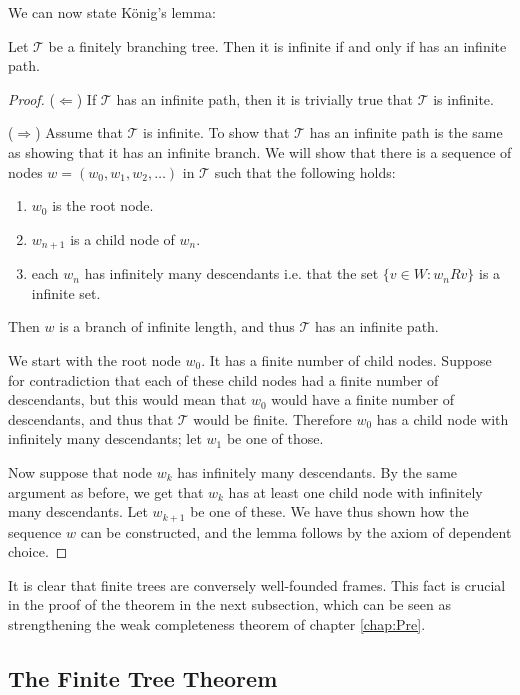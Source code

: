\documentclass[../main.tex]{subfiles}
\begin{document}
We can now state König's lemma:
\begin{lemma}
	\label{lem:kong}
	Let $\mathcal{T}$ be a finitely branching tree. Then it is infinite if
	and only if has an infinite path.
\end{lemma}
\begin{proof}
	($\Leftarrow$)
	If $\mathcal{T}$ has an infinite path, then it is trivially true that
	$\mathcal{T}$ is infinite. 

	($\Rightarrow$) Assume that $\mathcal{T}$ is infinite. To show that
	$\mathcal{T}$ has an infinite path is the same as showing that it has
	an infinite branch. We will show that there is a sequence of nodes
	$w=(w_0,w_1,w_2,\ldots)$ in $\mathcal{T}$ such that the following holds:
	\begin{enumerate}
		\item $w_0$ is the root node.
		\item $w_{n+1}$ is a child node of $w_n$.
		\item each $w_n$ has infinitely many descendants i.e. that the
			set $\{v\in W:w_nRv\}$ is a infinite set.
	\end{enumerate}
	Then $w$ is a branch of infinite length, and thus $\mathcal{T}$ has an
	infinite path.

	We start with the root node $w_0$. It has a finite number of child
	nodes. Suppose for contradiction that each of these child nodes had a
	finite number of descendants, but this would mean that $w_0$ would have
	a finite number of descendants, and thus that $\mathcal{T}$ would be
	finite. Therefore $w_0$ has a child node with infinitely many
	descendants; let $w_1$ be one of those.

	Now suppose that node $w_k$ has infinitely many descendants. By the
	same argument as before, we get that $w_k$ has at least one child node
	with infinitely many descendants. Let $w_{k+1}$ be one of these. We have
	thus shown how the sequence $w$ can be constructed, and the lemma
	follows by the axiom of dependent choice.
\end{proof}

It is clear that finite trees are conversely well-founded frames. This fact is crucial
in the proof of the theorem in the next subsection, which can be seen as strengthening the
weak completeness theorem of chapter \ref{chap:Pre}.

\subsection{The Finite Tree Theorem}
\end{document}
